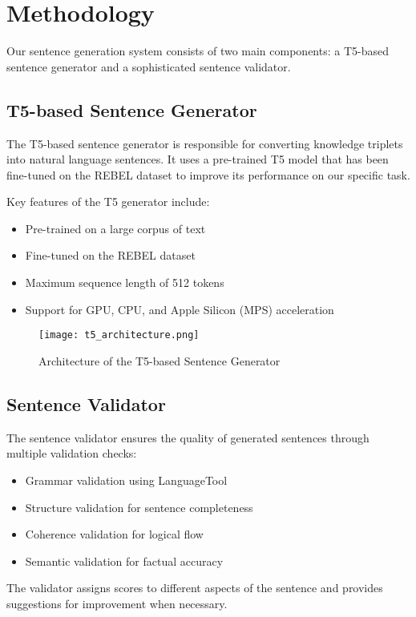 \documentclass[3p,times,procedia]{elsarticle}
\begin{document}
\section{Methodology}
Our sentence generation system consists of two main components: a T5-based sentence generator and a sophisticated sentence validator.

\subsection{T5-based Sentence Generator}
The T5-based sentence generator is responsible for converting knowledge triplets into natural language sentences. It uses a pre-trained T5 model that has been fine-tuned on the REBEL dataset to improve its performance on our specific task.

Key features of the T5 generator include:
\begin{itemize}
    \item Pre-trained on a large corpus of text
    \item Fine-tuned on the REBEL dataset
    \item Maximum sequence length of 512 tokens
    \item Support for GPU, CPU, and Apple Silicon (MPS) acceleration
\end{itemize}

\begin{figure}[ht!]
    \centering
    \texttt{[image: t5\_architecture.png]}
    \caption{Architecture of the T5-based Sentence Generator}
    \label{fig:t5_generator}
\end{figure}

\subsection{Sentence Validator}
The sentence validator ensures the quality of generated sentences through multiple validation checks:
\begin{itemize}
    \item Grammar validation using LanguageTool
    \item Structure validation for sentence completeness
    \item Coherence validation for logical flow
    \item Semantic validation for factual accuracy
\end{itemize}

The validator assigns scores to different aspects of the sentence and provides suggestions for improvement when necessary.
\end{document}
